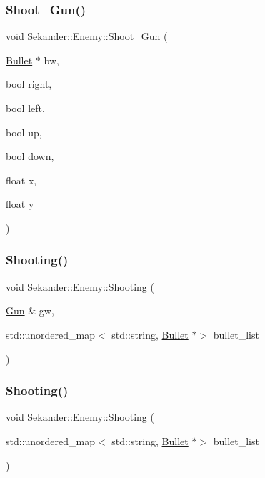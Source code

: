 \subsubsection{\texorpdfstring{Shoot\+\_\+\+Gun()}{Shoot\_Gun()}}
{\footnotesize\ttfamily void Sekander\+::\+Enemy\+::\+Shoot\+\_\+\+Gun (\begin{DoxyParamCaption}\item[{\hyperlink{classSekander_1_1Bullet}{Bullet} $\ast$}]{bw,  }\item[{bool}]{right,  }\item[{bool}]{left,  }\item[{bool}]{up,  }\item[{bool}]{down,  }\item[{float}]{x,  }\item[{float}]{y }\end{DoxyParamCaption})}

\mbox{\label{classSekander_1_1Enemy_a53a51c2c7734f378c1ea3fb21f47de0b}} 
\subsubsection{\texorpdfstring{Shooting()}{Shooting()}\hspace{0.1cm}{\footnotesize\ttfamily [1/2]}}
{\footnotesize\ttfamily void Sekander\+::\+Enemy\+::\+Shooting (\begin{DoxyParamCaption}\item[{\hyperlink{classSekander_1_1Gun}{Gun} \&}]{gw,  }\item[{std\+::unordered\+\_\+map$<$ std\+::string, \hyperlink{classSekander_1_1Bullet}{Bullet} $\ast$$>$}]{bullet\+\_\+list }\end{DoxyParamCaption})}

\mbox{\label{classSekander_1_1Enemy_aaf647778a6a1a598006fc905ed98df66}} 
\subsubsection{\texorpdfstring{Shooting()}{Shooting()}\hspace{0.1cm}{\footnotesize\ttfamily [2/2]}}
{\footnotesize\ttfamily void Sekander\+::\+Enemy\+::\+Shooting (\begin{DoxyParamCaption}\item[{std\+::unordered\+\_\+map$<$ std\+::string, \hyperlink{classSekander_1_1Bullet}{Bullet} $\ast$$>$}]{bullet\+\_\+list }\end{DoxyParamCaption})}

